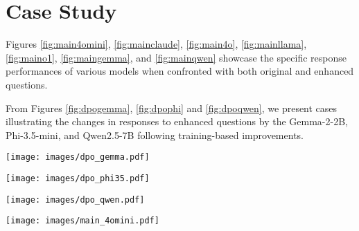     







\section{Case Study}
\label{appendix:case_study}
Figures \ref{fig:main4omini}, \ref{fig:mainclaude}, \ref{fig:main4o}, \ref{fig:mainllama}, \ref{fig:maino1}, \ref{fig:maingemma}, and \ref{fig:mainqwen} showcase the specific response performances of various models when confronted with both original and enhanced questions.

From Figures \ref{fig:dpogemma}, \ref{fig:dpophi} and \ref{fig:dpoqwen}, we present cases illustrating the changes in responses to enhanced questions by the Gemma-2-2B, Phi-3.5-mini, and Qwen2.5-7B following training-based improvements.


\begin{figure*}[ht]
    \centering
    \texttt{[image: images/dpo\_gemma.pdf]}
    \caption{Case study: Gemma-2-2B's responses to enhanced question before and after DPO.}
    \label{fig:dpogemma}
\end{figure*}

\begin{figure*}[ht]
    \centering
    \texttt{[image: images/dpo\_phi35.pdf]}
    \caption{Case study: Phi-3.5-mini's responses to enhanced question before and after DPO.}
    \label{fig:dpophi}
\end{figure*}

\begin{figure*}[ht]
    \centering
    \texttt{[image: images/dpo\_qwen.pdf]}
    \caption{Case study: Qwen2.5-7B's responses to enhanced question before and after DPO.}
    \label{fig:dpoqwen}
\end{figure*}

\begin{figure*}[ht]
    \centering
    \texttt{[image: images/main\_4omini.pdf]}
    \caption{Case study: GPT-4o-mini's responses to original questions and enhanced questions.}
    \label{fig:main4omini}
\end{figure*}

